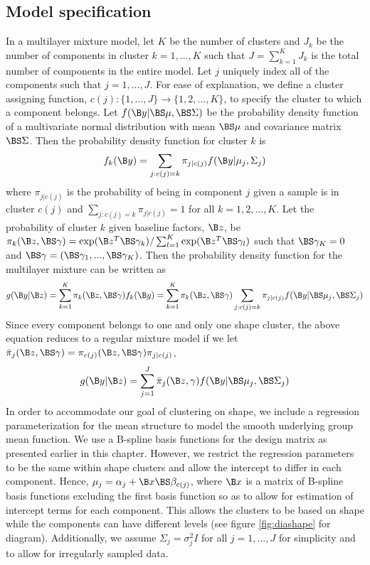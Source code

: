 \subsection{Model specification}
In a multilayer mixture model, let $K$ be the number of clusters and $J_{k}$ be the number of components in cluster $k=1,...,K$ such that $J=\sum_{k=1}^{K}J_{k}$ is the total number of components in the entire model. Let $j$ uniquely index all of the components such that $j=1,...,J$. For ease of explanation, we define a cluster assigning function, $c(j):\{1,...,J\}\rightarrow \{1,2,...,K\}$, to specify the cluster to which a component belongs. Let $f(\B y|\BS\mu,\BS\Sigma)$ be the probability density function of a multivariate normal distribution with mean $\BS\mu$ and covariance matrix $\BS\Sigma$. Then the probability density function for cluster $k$ is
$$f_{k}(\B y) = \sum_{j: c(j) = k} \pi_{j|c(j)}f(\B y|\mu_{j},\Sigma_{j})$$
where $\pi_{j|c(j)}$ is the probability of being in component $j$ given a sample is in cluster $c(j)$ and $\sum_{j: c(j) = k}\pi_{j|c(j)}=1$ for all $k=1,2,...,K$. Let the probability of cluster $k$ given baseline factors, $\B z$, be $\pi_{k}(\B z,\BS\gamma)=\exp(\B z^{T}\BS\gamma_{k})/\sum^{K}_{l=1}\exp(\B z^{T}\BS\gamma_{l})$ such that $\BS\gamma_{K}=0$ and $\BS\gamma=(\BS\gamma_{1},...,\BS\gamma_{K})$. Then the probability density function for the multilayer mixture can be written as
$$g(\B y|\B z) = \sum_{k=1}^{K}\pi_{k}(\B z,\BS \gamma)f_{k}(\B y) = \sum_{k=1}^{K}\pi_{k}(\B z,\BS\gamma)\sum_{j: c(j) = k} \pi_{j|c(j)}f( \B y| \BS\mu_{j},\BS\Sigma_{j})$$
Since every component belongs to one and only one shape cluster, the above equation reduces to a regular mixture model if we let $\bar{\pi}_{j}(\B z,\BS \gamma)=\pi_{c(j)}(\B z,\BS\gamma)\pi_{j|c(j)}$,
$$g(\B y|\B z) = \sum_{j=1}^{J}\bar{\pi}_{j}(\B z,\gamma)f(\B y|\BS \mu_{j},\BS\Sigma_{j})$$
In order to accommodate our goal of clustering on shape, we include a regression parameterization for the mean structure to model the smooth underlying group mean function. We use a B-spline basis functions for the design matrix as presented earlier in this chapter. However, we restrict the regression parameters to be the same within shape clusters and allow the intercept to differ in each component. Hence, $\mu_{j}=\alpha_{j}+\B x \BS\beta_{c(j)}$, where $\B x$ is a matrix of B-spline basis functions excluding the first basis function so as to allow for estimation of intercept terms for each component. This allows the clusters to be based on shape while the components can have different levels (see figure \ref{fig:diashape} for diagram). Additionally, we assume $\Sigma_{j}=\sigma^{2}_{j}I$ for all $j=1,...,J$  for simplicity and to allow for irregularly sampled data.

